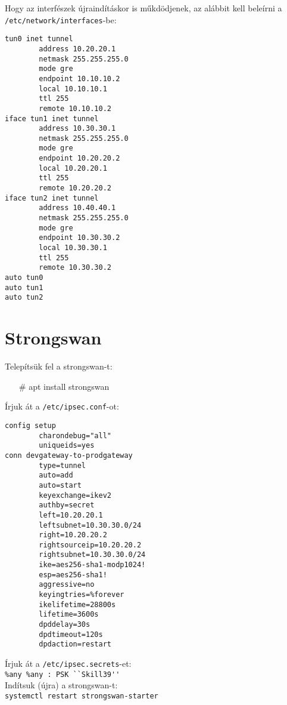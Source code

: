 \documentclass{article} %
\begin{document}
     Hogy az interfészek újraindításkor is műkdödjenek, az alábbit kell beleírni a \lstinline|/etc/network/interfaces|-be:
    \begin{lstlisting}
tun0 inet tunnel
        address 10.20.20.1
        netmask 255.255.255.0
        mode gre
        endpoint 10.10.10.2
        local 10.10.10.1
        ttl 255
        remote 10.10.10.2
iface tun1 inet tunnel
        address 10.30.30.1
        netmask 255.255.255.0
        mode gre
        endpoint 10.20.20.2
        local 10.20.20.1
        ttl 255
        remote 10.20.20.2
iface tun2 inet tunnel
        address 10.40.40.1
        netmask 255.255.255.0
        mode gre
        endpoint 10.30.30.2
        local 10.30.30.1
        ttl 255
        remote 10.30.30.2
auto tun0
auto tun1
auto tun2
    \end{lstlisting}





    \section*{Strongswan} %

    Telepítsük fel a strongswan-t:

    \begin{itemize}
	    \item[\#] apt install strongswan
    \end{itemize}

    Írjuk át a \lstinline|/etc/ipsec.conf|-ot:

    \begin{lstlisting}
config setup
        charondebug="all"
        uniqueids=yes
conn devgateway-to-prodgateway
        type=tunnel
        auto=add
        auto=start
        keyexchange=ikev2
        authby=secret
        left=10.20.20.1
        leftsubnet=10.30.30.0/24
        right=10.20.20.2
        rightsourceip=10.20.20.2
        rightsubnet=10.30.30.0/24
        ike=aes256-sha1-modp1024!
        esp=aes256-sha1!
        aggressive=no
        keyingtries=%forever
        ikelifetime=28800s
        lifetime=3600s
        dpddelay=30s
        dpdtimeout=120s
        dpdaction=restart
    \end{lstlisting}

    Írjuk át a \lstinline|/etc/ipsec.secrets|-et: \\
    \lstinline|%any %any : PSK ``Skill39''| \\


    Indítsuk (újra) a strongswan-t: \\
    \lstinline|systemctl restart strongswan-starter|
\end{document}
